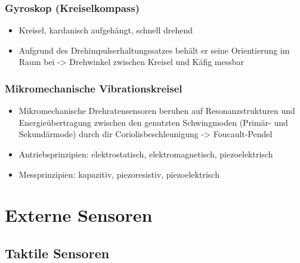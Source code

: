 \documentclass[paper=a4, fontsize=11pt]{scrartcl} %
\numberwithin{equation}{section} %
\numberwithin{figure}{section} %
\numberwithin{table}{section} %
\begin{document}
\subsubsection{Gyroskop (Kreiselkompass)}

\begin{itemize}
\item Kreisel, kardanisch aufgehängt, schnell drehend
\item Aufgrund des Drehimpulserhaltungssatzes behält er seine Orientierung im Raum bei -> Drehwinkel zwischen Kreisel und Käfig messbar
\end{itemize}

\subsubsection{Mikromechanische Vibrationskreisel}

\begin{itemize}
\item Mikromechanische Drehratensensoren beruhen auf Resonanzstrukturen und Energieübertragung zwischen den genutzten Schwingmoden (Primär- und Sekundärmode) durch dir Coriolisbeschleunigung -> Foucault-Pendel
\item Antriebsprinzipien: elektrostatisch, elektromagnetisch, piezoelektrisch
\item Messprinzipien: kapazitiv, piezoresistiv, piezoelektrisch
\end{itemize}

\section{Externe Sensoren}

\subsection{Taktile Sensoren}
\end{document}
